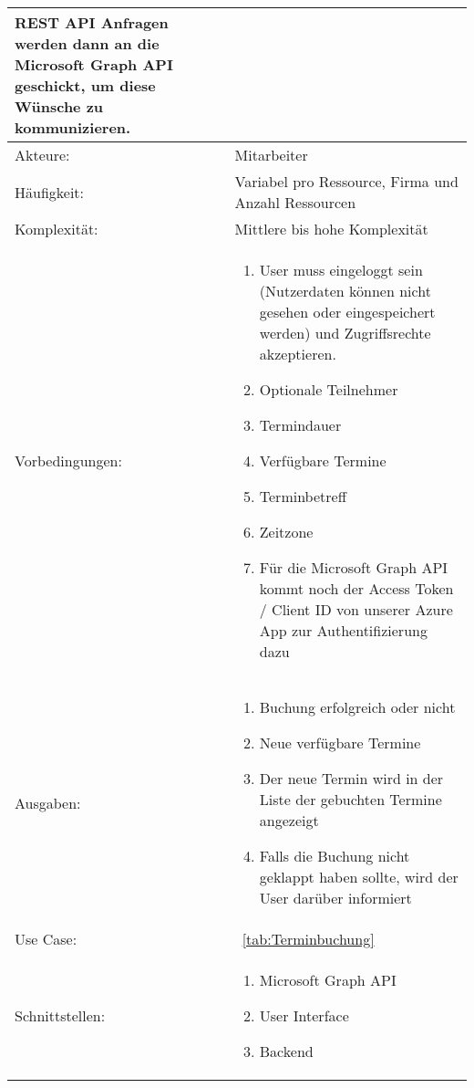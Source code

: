 \begin{tabularx}{\textwidth}{|X|X|}
    REST API Anfragen werden dann an die Microsoft Graph API geschickt, um diese Wünsche zu kommunizieren.\\
    \hline
    Akteure: & Mitarbeiter\\
    \hline
    Häufigkeit: & Variabel pro Ressource, Firma und Anzahl Ressourcen\\
    \hline
    Komplexität: & Mittlere bis hohe Komplexität\\
    \hline
    Vorbedingungen: & \begin{enumerate}
                          \item User muss eingeloggt sein (Nutzerdaten können nicht gesehen oder eingespeichert werden) und Zugriffsrechte akzeptieren.
                          \item Optionale Teilnehmer
                          \item Termindauer
                          \item Verfügbare Termine
                          \item Terminbetreff
                          \item Zeitzone
                          \item Für die Microsoft Graph API kommt noch der Access Token / Client ID von unserer Azure App zur Authentifizierung dazu
    \end{enumerate}\\
    \hline
    Ausgaben: & \begin{enumerate}
                    \item Buchung erfolgreich oder nicht
                    \item Neue verfügbare Termine
                    \item Der neue Termin wird in der Liste der gebuchten Termine angezeigt
                    \item Falls die Buchung nicht geklappt haben sollte, wird der User darüber informiert
    \end{enumerate}\\
    \hline
    Use Case: &~\ref{tab:Terminbuchung}\\
    \hline
Schnittstellen: & \begin{enumerate}
                        \item Microsoft Graph API
                        \item User Interface
                        \item Backend
                      \end{enumerate}\\

\end{tabularx}
